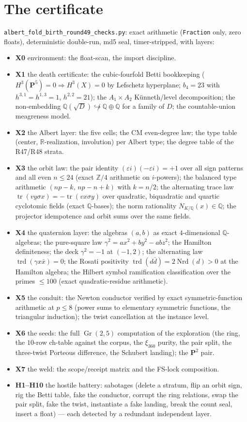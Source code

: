 \documentclass[11pt]{article}
\newcommand{\tr}{\operatorname{tr}}
\newcommand{\Z}{\mathbb Z}
\newcommand{\Q}{\mathbb Q}
\newcommand{\R}{\mathbb R}
\newcommand{\trd}{\operatorname{trd}}
\newcommand{\Nrd}{\operatorname{Nrd}}
\newcommand{\Gr}{\operatorname{Gr}}
\begin{document}
\section{The certificate}

\texttt{albert\_fold\_birth\_round49\_checks.py}: exact arithmetic
(\texttt{Fraction} only, zero floats), deterministic double-run, md5
seal, timer-stripped, with layers:
\begin{itemize}
\item \textbf{X0} environment: the float-scan, the import discipline.
\item \textbf{X1} the death certificate: the cubic-fourfold Betti
bookkeeping ($H^3(\mathbf P^5)=0\Rightarrow H^3(X)=0$ by Lefschetz
hyperplane; $b_4=23$ with $h^{3,1}=h^{1,3}=1$, $h^{2,2}=21$); the
$A_1\times A_2$ K\"unneth/level decomposition; the non-embedding
$\Q(\sqrt D)\not\hookrightarrow\Q\oplus\Q$ for a family of $D$; the
countable-union meagreness model.
\item \textbf{X2} the Albert layer: the five cells; the CM even-degree
law; the type table (center, $\R$-realization, involution) per
Albert type; the degree table of the R47/R48 strata.
\item \textbf{X3} the orbit law: the pair identity
$(\varepsilon i)(-\varepsilon i)=+1$ over all sign patterns and all
even $n\le24$ (exact $\Z/4$ arithmetic on $i$-powers); the balanced
type arithmetic $(np-k,\,np-n+k)$ with $k=n/2$; the alternating trace
law $\tr(vy\sigma x)=-\tr(vx\sigma y)$ over quadratic, biquadratic
and quartic cyclotomic fields (exact $\Q$-bases); the norm
rationality $N_{K/\Q}(x)\in\Q$; the projector idempotence and orbit
sums over the same fields.
\item \textbf{X4} the quaternion layer: the algebras $(a,b)$ as exact
$4$-dimensional $\Q$-algebras; the pure-square law
$\gamma^2=ax^2+by^2-abz^2$; the Hamilton definiteness; the deck
$\gamma^2=-1$ at $(-1,2)$; the alternating law
$\trd(\gamma x\bar x)=0$; the Rosati positivity
$\trd(d\bar d)=2\Nrd(d)>0$ at the Hamilton algebra; the Hilbert
symbol ramification classification over the primes $\le 100$ (exact
quadratic-residue arithmetic).
\item \textbf{X5} the conduit: the Newton conductor verified by exact
symmetric-function arithmetic at $p\le8$ (power sums to elementary
symmetric functions, the triangular induction); the twist
cancellation at the instance level.
\item \textbf{X6} the seeds: the full $\Gr(2,5)$ computation of the
exploration (the ring, the $10$-row ch-table against the corpus, the
$\xi_{360}$ purity, the pair split, the three-twist Porteous
difference, the Schubert landing); the $\mathbf P^2$ pair.
\item \textbf{X7} the weld: the scope/receipt matrix and the FS-lock
composition.
\item \textbf{H1--H10} the hostile battery: sabotages (delete a
stratum, flip an orbit sign, rig the Betti table, fake the conductor,
corrupt the ring relations, swap the pair split, fake the twist,
instantiate a fake landing, break the count seal, insert a float) ---
each detected by a redundant independent layer.
\end{itemize}
\end{document}
